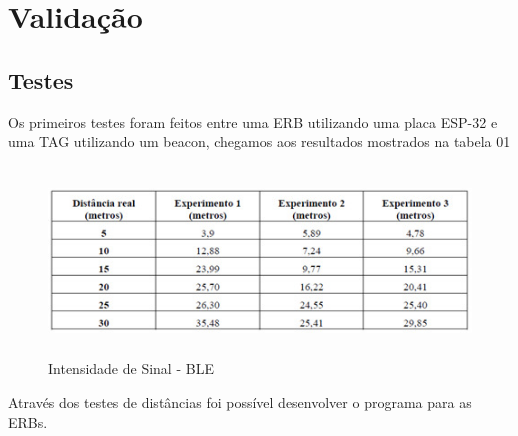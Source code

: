 \documentclass[
	article,			%
	12pt,				%
	oneside,			%
	a4paper,			%
	english,			%
	brazil,				%
	sumario=tradicional
	]{abntex2}
\begin{document}
\section{Validação}
\subsection{Testes}
Os primeiros testes foram feitos entre uma ERB utilizando uma placa ESP-32 e uma TAG utilizando um beacon, chegamos aos resultados mostrados na tabela 01
\begin{figure}[H]
	\begin{center}
		\caption{Intensidade de Sinal - BLE}
		\includegraphics[height=5cm]{image7}
	\end{center}
\end{figure}	
Através dos testes de distâncias foi possível desenvolver o programa para as ERBs. 
\end{document}
